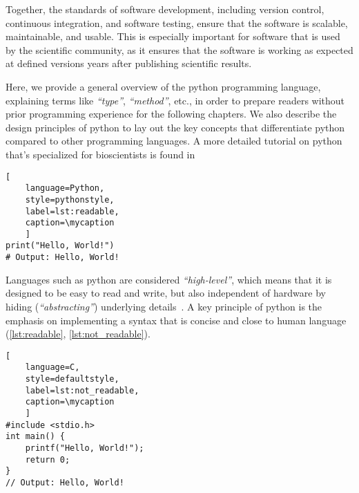 Together, the standards of software development, including version control,
continuous integration, and software testing, ensure that the software is
scalable, maintainable, and usable. This is especially important for software
that is used by the scientific community, as it ensures that the software is
working as expected at defined versions years after publishing scientific
results.

Here, we provide a general overview of the python programming language,
explaining terms like \textit{``type''}, \textit{``method''}, etc., in order to
prepare readers without prior programming experience for the following chapters.
We also describe the design principles of python to lay out the key concepts
that differentiate python compared to other programming languages. A more
detailed tutorial on python that's specialized for bioscientists is found
in~\citealt{ekmekciIntroductionProgrammingBioscientists2016}

\def\mycaption{ Example of
    readable python code. This one-line code returns the words (string)
    \texttt{'Hello, World!'} when executed. The command is straightforward and easy
    to understand.}
\begin{lstlisting}[
    language=Python, 
    style=pythonstyle,
    label=lst:readable,
    caption=\mycaption
    ]
print("Hello, World!")
# Output: Hello, World!
\end{lstlisting}

Languages such as python are considered \textit{``high-level''}, which means
that it is designed to be easy to read and write, but also independent of
hardware by hiding (\textit{``abstracting''}) underlying
details~\cite{PythonLanguageReference}. A key principle of python is the
emphasis on implementing a syntax that is concise and close to human language
(\autoref{lst:readable}, \autoref{lst:not_readable}).

\def\mycaption{ Example of less readable code written in the low-level
    programming language C. This code is doing exactly the same as the python
    code in \autoref{lst:readable}. The command is harder to understand because
    more steps are needed to access the same functionality, including the
    definition of a function}
\begin{lstlisting}[
    language=C, 
    style=defaultstyle,
    label=lst:not_readable, 
    caption=\mycaption
    ]
#include <stdio.h>
int main() {
    printf("Hello, World!");
    return 0;
}
// Output: Hello, World!
\end{lstlisting}

